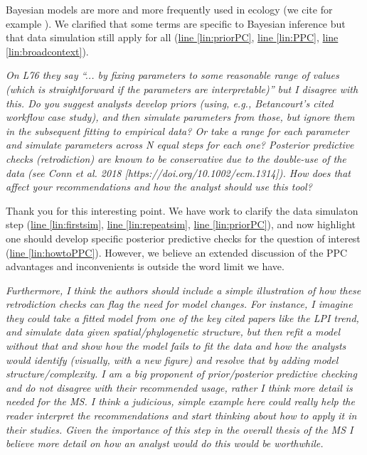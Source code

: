\documentclass[11pt,letter]{article}
\begin{document}
Bayesian models are more and more frequently used in ecology (we cite for example \citealp{Johnson2024}). %
We clarified that some terms are specific to Bayesian inference but that data simulation still apply for all (\href{file:forecastflows_r1\#lintarget:priorPC}{line \ref*{lin:priorPC}}, \href{file:forecastflows_r1\#lintarget:PPC}{line \ref*{lin:PPC}}, \href{file:forecastflows_r1\#lintarget:broadcontext}{line \ref*{lin:broadcontext}}).

\begin{mybox}
\emph{On L76 they say “... by fixing parameters to some reasonable range of values (which is straightforward if the parameters are interpretable)” but I disagree with this. Do you suggest analysts develop priors (using, e.g., Betancourt’s cited workflow case study), and then simulate parameters from those, but ignore them in the subsequent fitting to empirical data? Or take a range for each parameter and simulate parameters across N equal steps for each one? Posterior predictive checks (retrodiction) are known to be conservative due to the double-use of the data (see Conn et al. 2018 [https://doi.org/10.1002/ecm.1314]). How does that affect your recommendations and how the analyst should use this tool?}
\end{mybox}

Thank you for this interesting point. We have work to clarify the data simulaton step (\href{file:forecastflows_r1\#lintarget:firstsim}{line \ref*{lin:firstsim}}, \href{file:forecastflows_r1\#lintarget:repeatsim}{line \ref*{lin:repeatsim}}, \href{file:forecastflows_r1\#lintarget:priorPC}{line \ref*{lin:priorPC}}), and now highlight one should develop specific posterior predictive checks for the question of interest (\href{file:forecastflows_r1\#lintarget:howtoPPC}{line \ref*{lin:howtoPPC}}). However, we believe an extended discussion of the PPC advantages and inconvenients is outside the word limit we have.

\begin{mybox}
\emph{Furthermore, I think the authors should include a simple illustration of how these retrodiction checks can flag the need for model changes. For instance, I imagine they could take a fitted model from one of the key cited papers like the LPI trend, and simulate data given spatial/phylogenetic structure, but then refit a model without that and show how the model fails to fit the data and how the analysts would identify (visually, with a new figure) and resolve that by adding model structure/complexity. I am a big proponent of prior/posterior predictive checking and do not disagree with their recommended usage, rather I think more detail is needed for the MS. I think a judicious, simple example here could really help the reader interpret the recommendations and start thinking about how to apply it in their studies. Given the importance of this step in the overall thesis of the MS I believe more detail on how an analyst would do this would be worthwhile.}
\end{mybox}
\end{document}
